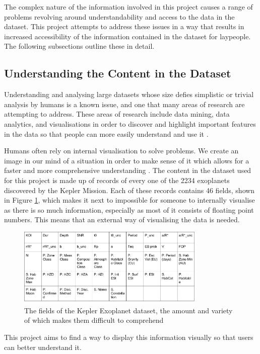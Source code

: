 The complex nature of the information involved in this project causes a range of
problems revolving around understandability and access to the data in the dataset. This project
attempts to address these issues in a way that results in increased
accessibility of the information contained in the dataset for laypeople. The
following subsections outline these in detail.

\subsection{Understanding the Content in the Dataset}
Understanding and analysing large datasets whose size defies simplistic or
trivial analysis by humans is a known issue, and one that many areas of research
are
attempting to address. These areas of research include data mining, data
analytics, and visualisations in order to discover and highlight important
features in the data so that people can more easily understand and use it \cite{chan}. 

Humans often rely on internal visualisation to solve problems. We create an
image in our mind of a situation in order to make sense of it
 which allows for a faster and more comprehensive
understanding \cite{visualisingpiggott}. The content in the dataset used
for this project is made up of records of every one of the 2234 exoplanets
discovered by the Kepler Mission. Each of these records contains 46 fields, shown
in Figure \ref{fig:fields}, which
makes it next to impossible for someone to internally visualise as there is so
much information, especially as most of it consists of floating point numbers.
This means that an external
way of visualising the data is needed.
\begin{figure}[H]
  \centering
      \includegraphics[width=0.8\textwidth]{images/data.png}
  \caption[Kepler Exoplanet dataset fields]{The fields of the Kepler Exoplanet dataset, the amount and variety of which makes them difficult to comprehend}
  \label{fig:fields}
\end{figure}
 This project aims to find a way to display this information visually
so that users can better understand it.
